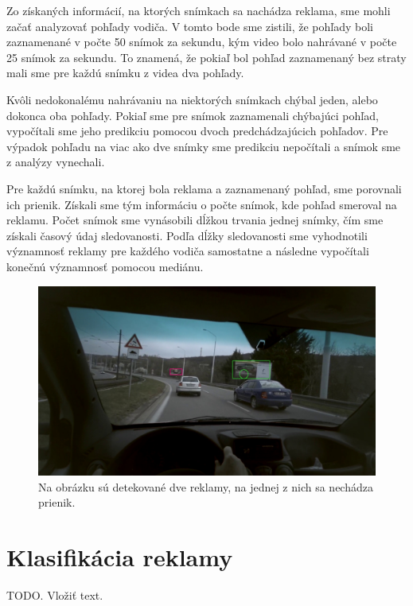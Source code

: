 Zo získaných informácií, na ktorých snímkach sa nachádza reklama, sme mohli začať analyzovať pohľady vodiča. V tomto bode sme zistili, že pohľady boli zaznamenané v počte 50 snímok za sekundu, kým video bolo nahrávané v počte 25 snímok za sekundu. To znamená, že pokiaľ bol pohľad zaznamenaný bez straty mali sme pre každú snímku z videa dva pohľady.

Kvôli nedokonalému nahrávaniu na niektorých snímkach chýbal jeden, alebo dokonca oba pohľady. Pokiaľ sme pre snímok zaznamenali chýbajúci pohľad, vypočítali sme jeho predikciu pomocou dvoch predchádzajúcich pohľadov. Pre výpadok pohľadu na viac ako dve snímky sme predikciu nepočítali a snímok sme z analýzy vynechali.

Pre každú snímku, na ktorej bola reklama a zaznamenaný pohľad, sme porovnali ich prienik. Získali sme tým informáciu o počte snímok, kde pohľad smeroval na reklamu. Počet snímok sme vynásobili dĺžkou trvania jednej snímky, čím sme získali časový údaj sledovanosti. Podľa dĺžky sledovanosti sme vyhodnotili významnosť reklamy pre každého vodiča samostatne a následne vypočítali konečnú významnosť pomocou mediánu.

 \begin{figure}[ht]
     \centering
     \includegraphics[width=1\textwidth]{images/04/iou.jpg}
     \caption{Na obrázku sú detekované dve reklamy, na jednej z nich sa nechádza prienik.}
     \label{img:tracking}
 \end{figure}

\section{Klasifikácia reklamy}

TODO. Vložiť text.

\newpage

